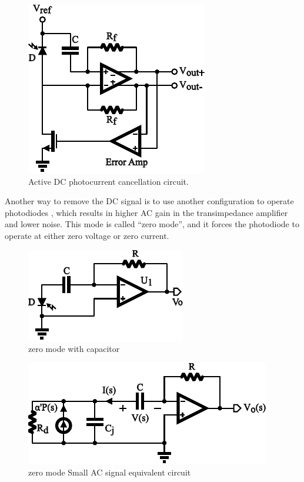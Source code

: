 \begin{figure}[h]
\centerline{\includegraphics[width=0.6\linewidth]{3-literature/IFeedbackSch.pdf}}
\caption{Active DC photocurrent cancellation circuit.}
\label{fig_IFeedbackSch}
\end{figure}

Another way to remove the DC signal is to use another configuration to operate photodiodes \cite{zero-mode_detection}, which results in higher AC gain in the transimpedance amplifier and lower noise.  This mode is called “zero mode”, and it forces the photodiode to operate at either zero voltage or zero current.  

\begin{figure}[h]
\centerline{\includegraphics[width=0.6\linewidth]{zero_mode_sch.pdf}}
\caption{zero mode with capacitor}
\label{fig_zero_mode_sch}
\end{figure}

\begin{figure}[h]
\centerline{\includegraphics[width=0.8\linewidth]{3-literature/ZeroModeSS.pdf}}
\caption{zero mode Small AC signal equivalent circuit}
\label{fig_ZeroModeSS}
\end{figure}

